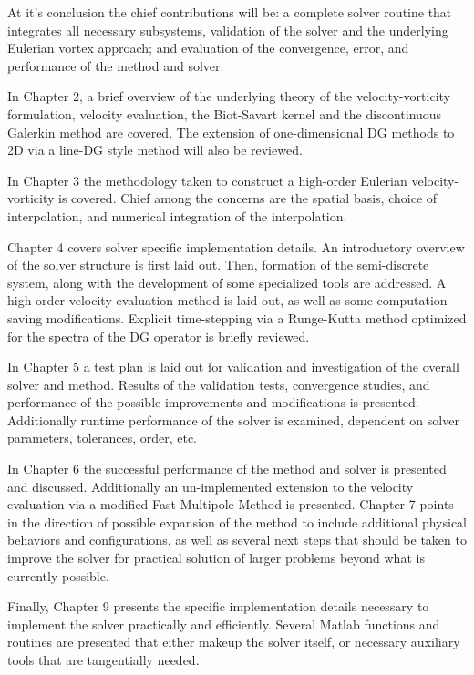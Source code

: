 \documentclass[letterpaper,12pt]{report}
\begin{document}
At it's conclusion the chief contributions will be: a complete solver routine that integrates all necessary subsystems, validation of the solver and the underlying Eulerian vortex approach; and evaluation of the convergence, error, and performance of the method and solver.

In Chapter 2, a brief overview of the underlying theory of the velocity-vorticity formulation, velocity evaluation, the Biot-Savart  kernel and the discontinuous Galerkin method are covered. The extension of one-dimensional DG methods to 2D via a line-DG style method will also be reviewed. 

In Chapter 3 the methodology taken to construct a high-order Eulerian velocity-vorticity is covered. Chief among the concerns are the spatial basis, choice of interpolation, and numerical integration of the interpolation.

Chapter 4 covers solver specific implementation details. An introductory overview of the solver structure is first laid out. Then, formation of the semi-discrete system, along with the development of some specialized tools are addressed. A high-order velocity evaluation method is laid out, as well as some computation-saving modifications. Explicit time-stepping via a Runge-Kutta method optimized for the spectra of the DG operator is briefly reviewed.

In Chapter 5  a test plan is laid out for validation and investigation of the overall solver and method. Results of the validation tests, convergence studies, and performance of the possible improvements and modifications is presented. Additionally runtime performance of the solver is examined, dependent on solver parameters, tolerances, order, etc.

In Chapter 6 the successful performance of the method and solver is presented and discussed. Additionally an un-implemented extension to the velocity evaluation via a modified Fast Multipole Method is presented. Chapter 7 points in the direction of possible expansion of the method to include additional physical behaviors and configurations, as well as several next steps that should be taken to improve the solver for practical solution of larger problems beyond what is currently possible.

Finally, Chapter 9 presents the specific implementation details necessary to implement the solver practically and efficiently. Several Matlab functions and routines are presented that either makeup the solver itself, or necessary auxiliary tools that are tangentially needed.
\end{document}
